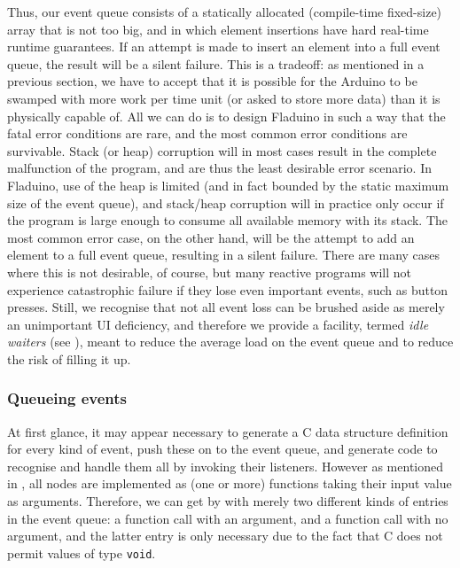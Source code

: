 \documentclass[a4paper, oneside, final]{memoir}
\let\Fref\undefined
\begin{document}
Thus, our event queue consists of a statically allocated (compile-time
fixed-size) array that is not too big, and in which element insertions
have hard real-time runtime guarantees.  If an attempt is made to
insert an element into a full event queue, the result will be a silent
failure.  This is a tradeoff: as mentioned in a previous section, we
have to accept that it is possible for the Arduino to be swamped with
more work per time unit (or asked to store more data) than it is
physically capable of.  All we can do is to design Fladuino in such a
way that the fatal error conditions are rare, and the most common
error conditions are survivable.  Stack (or heap) corruption will in
most cases result in the complete malfunction of the program, and are
thus the least desirable error scenario.  In Fladuino, use of the heap
is limited (and in fact bounded by the static maximum size of the
event queue), and stack/heap corruption will in practice only occur if
the program is large enough to consume all available memory with its
stack.  The most common error case, on the other hand, will be the
attempt to add an element to a full event queue, resulting in a silent
failure.  There are many cases where this is not desirable, of course,
but many reactive programs will not experience catastrophic failure if
they lose even important events, such as button presses.  Still, we
recognise that not all event loss can be brushed aside as merely an
unimportant UI deficiency, and therefore we provide a facility, termed
\textit{idle waiters} (see \Fref{sec:idle waiters}), meant to reduce
the average load on the event queue and to reduce the risk of filling
it up.

\subsubsection{Queueing events}

At first glance, it may appear necessary to generate a C data
structure definition for every kind of event, push these on to the
event queue, and generate code to recognise and handle them all by
invoking their listeners.  However as mentioned in
\Fref[plain]{sec:dataflowtranslation}, all nodes are implemented as (one or
more) functions taking their input value as arguments.  Therefore, we
can get by with merely two different kinds of entries in the event
queue: a function call with an argument, and a function call with no
argument, and the latter entry is only necessary due to the fact that
C does not permit values of type \texttt{void}.
\end{document}
